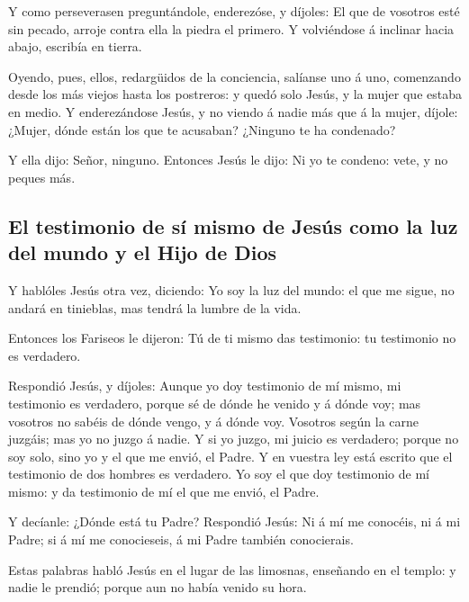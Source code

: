  Y como perseverasen preguntándole, enderezóse, y díjoles:
El que de vosotros esté sin pecado, arroje contra ella la piedra el
primero.  Y volviéndose á inclinar hacia abajo, escribía en
tierra.

 Oyendo, pues, ellos, redargüidos de la conciencia, salíanse
uno á uno, comenzando desde los más viejos hasta los postreros: y quedó
solo Jesús, y la mujer que estaba en medio.  Y
enderezándose Jesús, y no viendo á nadie más que á la mujer, díjole:
¿Mujer, dónde están los que te acusaban? ¿Ninguno te ha condenado?

 Y ella dijo: Señor, ninguno. Entonces Jesús le dijo: Ni yo
te condeno: vete, y no peques más.

\hypertarget{el-testimonio-de-suxed-mismo-de-jesuxfas-como-la-luz-del-mundo-y-el-hijo-de-dios}{%
\subsection{El testimonio de sí mismo de Jesús como la luz del mundo y
el Hijo de
Dios}\label{el-testimonio-de-suxed-mismo-de-jesuxfas-como-la-luz-del-mundo-y-el-hijo-de-dios}}

 Y hablóles Jesús otra vez, diciendo: Yo soy la luz del
mundo: el que me sigue, no andará en tinieblas, mas tendrá la lumbre de
la vida.

 Entonces los Fariseos le dijeron: Tú de ti mismo das
testimonio: tu testimonio no es verdadero.

 Respondió Jesús, y díjoles: Aunque yo doy testimonio de mí
mismo, mi testimonio es verdadero, porque sé de dónde he venido y á
dónde voy; mas vosotros no sabéis de dónde vengo, y á dónde voy.
 Vosotros según la carne juzgáis; mas yo no juzgo á nadie.
 Y si yo juzgo, mi juicio es verdadero; porque no soy solo,
sino yo y el que me envió, el Padre.  Y en vuestra ley está
escrito que el testimonio de dos hombres es verdadero.  Yo
soy el que doy testimonio de mí mismo: y da testimonio de mí el que me
envió, el Padre.

 Y decíanle: ¿Dónde está tu Padre? Respondió Jesús: Ni á mí
me conocéis, ni á mi Padre; si á mí me conocieseis, á mi Padre también
conocierais.

 Estas palabras habló Jesús en el lugar de las limosnas,
enseñando en el templo: y nadie le prendió; porque aun no había venido
su hora.

